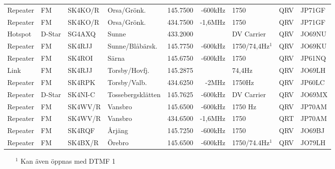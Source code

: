 \begin{longtable}{llllrrlcl}
Repeater & FM     & SK4KO/R  & Orsa/Grönk.         & 145.7500 & -600kHz    & 1750            & QRV  & JP71GF \\
Repeater & FM     & SK4KO/R  & Orsa/Grönk.         & 434.7500 & -1,6MHz    & 1750            & QRV  & JP71GF \\
Hotspot  & D-Star & SG4AXQ   & Sunne               & 433.2000 &            & DV Carrier      & QRV  & JO69NU \\
Repeater & FM     & SK4RJJ   & Sunne/Blåbärsk.     & 145.7750 & -600kHz    & 1750/74,4Hz$^1$ & QRV  & JO69KU \\
Repeater & FM     & SK4ROI   & Särna               & 145.6750 & -600kHz    & 1750            & QRV  & JP61NQ \\
Link     & FM     & SK4RJJ   & Torsby/Hovfj.       & 145.2875 &            & 74,4Hz          & QRV  & JO69LH \\
Repeater & FM     & SK4RPK   & Torsby/Valb.        & 434.6250 & -2MHz      & 1750Hz          & QRV  & JP60LC \\
Repeater & D-Star & SK4NI-C  & Tossebergsklätten   & 145.7625 & -600kHz    & DV Carrier      & QRV  & JO69MX \\
Repeater & FM     & SK4WV/R  & Vansbro             & 145.6500 & -600kHz    & 1750 Hz         & QRV  & JP70AM \\
Repeater & FM     & SK4WV/R  & Vansbro             & 434.6500 & -1,6MHz    & 1750            & QRT  & JP70AM \\
Repeater & FM     & SK4RQF   & Årjäng              & 145.7250 & -600kHz    & 1750            & QRV  & JO69BJ \\
Repeater & FM     & SK4BX/R  & Örebro              & 145.6500 & -600kHz    & 1750/74.4Hz$^1$ & QRV  & JO79LH

\end{longtable}
\begin{itemize}
\item[$^1$] Kan även öppnas med DTMF 1
\end{itemize}
